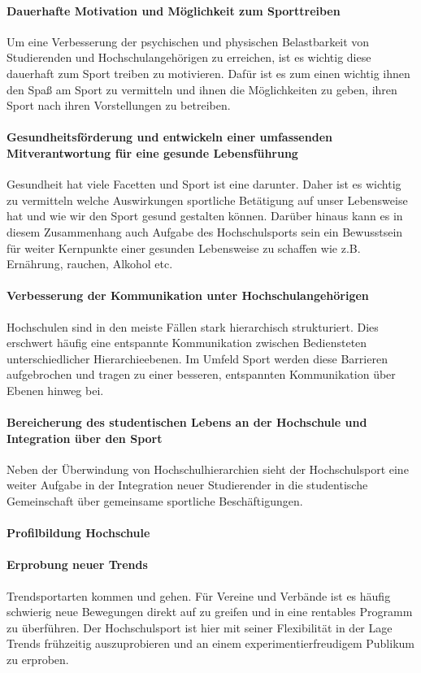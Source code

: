 \paragraph*{Dauerhafte Motivation und Möglichkeit zum Sporttreiben} 
Um eine Verbesserung der psychischen und physischen Belastbarkeit von Studierenden und Hochschulangehörigen zu erreichen, ist es wichtig diese dauerhaft zum Sport treiben zu motivieren. Dafür ist es zum einen wichtig ihnen den Spaß am Sport zu vermitteln und ihnen die Möglichkeiten zu geben, ihren Sport nach ihren Vorstellungen zu betreiben.
\paragraph*{Gesundheitsförderung und entwickeln einer umfassenden Mitverantwortung für eine gesunde Lebensführung}
Gesundheit hat viele Facetten und Sport ist eine darunter. Daher ist es wichtig zu vermitteln welche Auswirkungen sportliche Betätigung auf unser Lebensweise hat und wie wir den Sport gesund gestalten können. Darüber hinaus kann es in diesem Zusammenhang auch Aufgabe des Hochschulsports sein ein Bewusstsein für weiter Kernpunkte einer gesunden Lebensweise zu schaffen wie z.B. Ernährung, rauchen, Alkohol etc.
\paragraph*{Verbesserung der Kommunikation unter Hochschulangehörigen}
Hochschulen sind in den meiste Fällen stark hierarchisch strukturiert. Dies erschwert häufig eine entspannte Kommunikation zwischen Bediensteten unterschiedlicher Hierarchieebenen. Im Umfeld Sport werden diese Barrieren aufgebrochen und tragen zu einer besseren, entspannten Kommunikation über Ebenen hinweg bei.
\paragraph*{Bereicherung des studentischen Lebens an der Hochschule und Integration über den Sport}
Neben der Überwindung von Hochschulhierarchien sieht der Hochschulsport eine weiter Aufgabe in der Integration neuer Studierender in die studentische Gemeinschaft über gemeinsame sportliche Beschäftigungen.
\paragraph*{Profilbildung Hochschule}

\paragraph*{Erprobung neuer Trends}
Trendsportarten kommen und gehen. Für Vereine und Verbände ist es häufig schwierig neue Bewegungen direkt auf zu greifen und in eine rentables Programm zu überführen. Der Hochschulsport ist hier mit seiner Flexibilität in der Lage Trends frühzeitig auszuprobieren und an einem experimentierfreudigem Publikum zu erproben.

